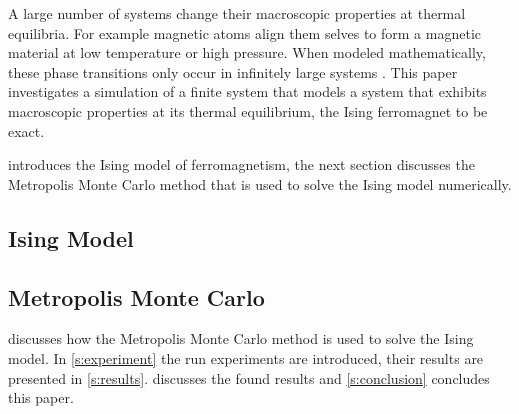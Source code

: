 A large number of systems change their macroscopic properties at thermal equilibria. For example magnetic atoms align them selves to form a magnetic material at low temperature or high pressure. When modeled mathematically, these phase transitions only occur in infinitely large systems \cite{kenzel1997physics}. This paper investigates a simulation of a finite system that models a system that exhibits macroscopic properties at its thermal equilibrium, the Ising ferromagnet to be exact.

 introduces the Ising model of ferromagnetism, the next section discusses the Metropolis Monte Carlo method that is used to solve the Ising model numerically.

\subsection{Ising Model}
	\label{ss:intro:ising}
	

\subsection{Metropolis Monte Carlo}
	\label{ss:intro:mmc}
	

 discusses how the Metropolis Monte Carlo method is used to solve the Ising model. In \cref{s:experiment} the run experiments are introduced, their results are presented in \cref{s:results}.  discusses the found results and \cref{s:conclusion} concludes this paper.
